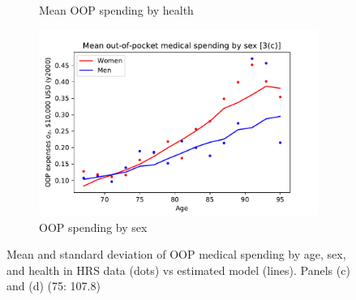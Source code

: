 \documentclass[12pt,pdftex,letterpaper]{article}
\begin{document}
\begin{figure}[h!]
\begin{subfigure}[b]{0.49\textwidth}
        \caption{Mean OOP spending by health}
    \end{subfigure}
    \begin{subfigure}[b]{0.49\textwidth}
        \centering
        \includegraphics[width=\textwidth]{../Figures/OOPbySexAge.pdf}
        \caption{OOP spending by sex}
    \end{subfigure}
    \caption{Mean and standard deviation of OOP medical spending by age, sex, and health in HRS data (dots) vs estimated model (lines). Panels (c) and (d) (75: 107.8)}
    \label{fig:MomentCat34}
\end{figure}
\end{document}
